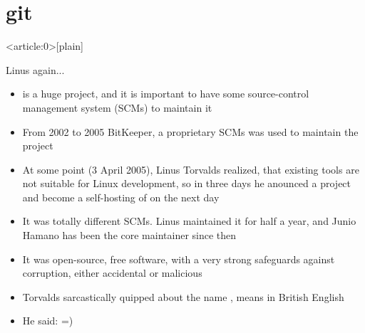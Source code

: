 \documentclass[usenames,dvipsnames,10pt,aspectratio=169]{beamer}
\begin{document}
\section{git}
{ %
    \begin{frame}<article:0>[plain]
     \end{frame}
}

\begin{frame}{Linus again...}
    \begin{itemize}
        \item {} is a huge project, and it is important to have some source-control management system (SCMs) to maintain it
        \item From 2002 to 2005 BitKeeper, a proprietary SCMs was used to maintain the project
        \item At some point (3 April 2005), Linus Torvalds realized, that existing tools are not suitable for Linux development, so in three days he anounced a project and become a self-hosting of  on the next day
        \item It was totally different SCMs. Linus maintained it for half a year, and Junio Hamano has been the core maintainer since then
        \item It was open-source, free software, with a very strong safeguards against corruption, either accidental or malicious
        \item Torvalds sarcastically quipped about the name , means  in British English
        \item He said:  =)
    \end{itemize}
\end{frame}
\end{document}
